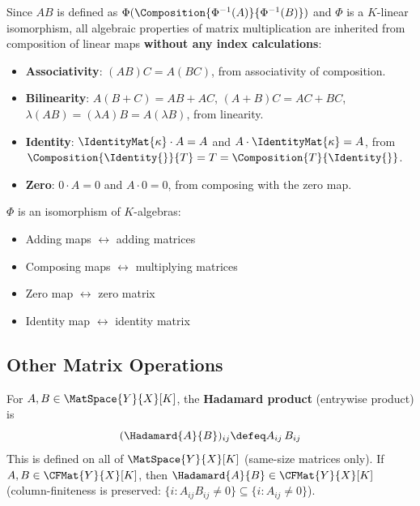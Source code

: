 \begin{remark}
    Since $AB$ is defined as $\Phi(\Composition{\Phi^{-1}(A)}{\Phi^{-1}(B)})$ and $\Phi$
    is a $K$-linear isomorphism, all algebraic properties of matrix multiplication are
    inherited from composition of linear maps \textbf{without any index calculations}:
    \begin{itemize}
        \item \textbf{Associativity}: $(AB)C = A(BC)$, from associativity of composition.
        \item \textbf{Bilinearity}: $A(B + C) = AB + AC$,\;
              $(A + B)C = AC + BC$,\;
              $\lambda(AB) = (\lambda A)B = A(\lambda B)$, from linearity.
        \item \textbf{Identity}: $\IdentityMat{\kappa} \cdot A = A$ and $A \cdot \IdentityMat{\kappa} = A$,
              from $\Composition{\Identity{}}{T} = T = \Composition{T}{\Identity{}}$.
        \item \textbf{Zero}: $0 \cdot A = 0$ and $A \cdot 0 = 0$, from composing with the
              zero map.
    \end{itemize}
\end{remark}

\begin{corollary}
\label{cor:end-algebra-iso}
    $\Phi$ is an isomorphism of $K$-algebras:
    \begin{itemize}
        \item Adding maps $\leftrightarrow$ adding matrices
        \item Composing maps $\leftrightarrow$ multiplying matrices
        \item Zero map $\leftrightarrow$ zero matrix
        \item Identity map $\leftrightarrow$ identity matrix
    \end{itemize}
\end{corollary}

\subsection{Other Matrix Operations}

\begin{definition}
\label{def:hadamard}
    For $A, B \in \MatSpace{Y}{X}[K]$, the \textbf{Hadamard product} (entrywise product) is
    \[
        (\Hadamard{A}{B})_{ij} \defeq A_{ij}\, B_{ij}
    \]
    This is defined on all of $\MatSpace{Y}{X}[K]$ (same-size matrices only).
    If $A, B \in \CFMat{Y}{X}[K]$, then $\Hadamard{A}{B} \in \CFMat{Y}{X}[K]$
    (column-finiteness is preserved: $\{i : A_{ij} B_{ij} \neq 0\}
    \subseteq \{i : A_{ij} \neq 0\}$).
\end{definition}

